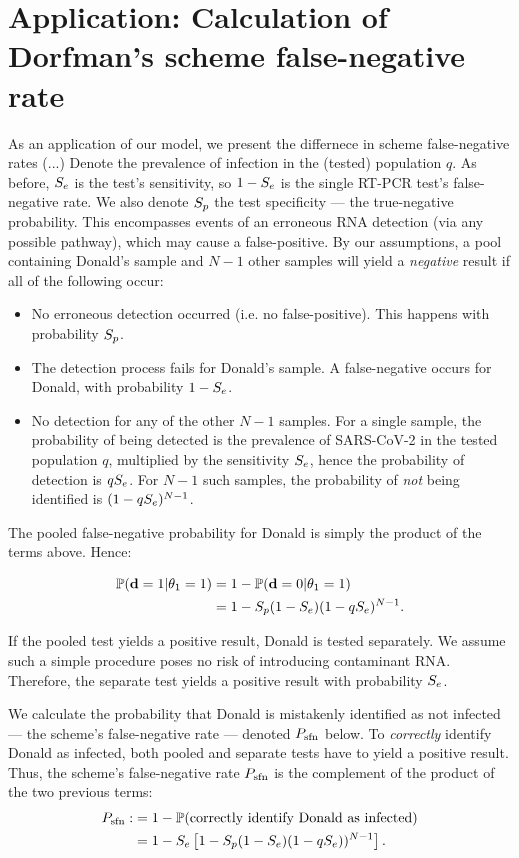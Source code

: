 \documentclass{article}
\begin{document}
\section{Application: Calculation of Dorfman's scheme false-negative rate}\label{subsec:detailed}
As an application of our model, we present the differnece in scheme
false-negative rates (...) Denote the prevalence of infection in the
(tested) population $q$. As before, $S_e$ is the test's sensitivity,
so $1-S_e$ is the single RT-PCR test's false-negative rate. We also
denote $S_p$ the test specificity --- the true-negative
probability. This encompasses events of an erroneous RNA detection
(via any possible pathway), which may cause a false-positive. By our
assumptions, a pool containing Donald's sample and $N-1$ other samples
will yield a \emph{negative} result if all of the following occur:
\begin{itemize}
\item No erroneous detection occurred (i.e. no false-positive). This
  happens with probability $S_p$.
\item The detection process fails for Donald's sample. A
  false-negative occurs for Donald, with probability $1-S_e$.
\item No detection for any of the other $N-1$ samples. For a single
  sample, the probability of being detected is the prevalence of
  SARS-CoV-2 in the tested population $q$, multiplied by the
  sensitivity $S_e$, hence the probability of detection is $qS_e$. For
  $N-1$ such samples, the probability of \emph{not} being identified
  is $(1-qS_e)^{N-1}$.
\end{itemize}
The pooled false-negative probability for Donald is simply the product of the terms above. Hence:

\begin{align}
    \begin{split}
        \mathbb{P}(\mathbf{d}=1|\theta_1=1) &= 1 - \mathbb{P}(\mathbf{d}=0|\theta_1=1) \\
        &= 1 - S_p(1-S_e)(1-qS_e)^{N-1}.
    \end{split}
\end{align}

If the pooled test yields a positive result, Donald is tested
separately. We assume such a simple procedure poses no risk of
introducing contaminant RNA. Therefore, the separate test yields a
positive result with probability $S_e$.

We calculate the probability that Donald is mistakenly identified as
not infected --- the scheme's false-negative rate --- denoted $P_{\text{sfn}}$
below. To \emph{correctly} identify Donald as infected, both pooled
and separate tests have to yield a positive result. Thus, the scheme's
false-negative rate $P_{\text{sfn}}$ is the complement of the product of the two
previous terms:
\begin{align}\label{eq:sfn}
    \begin{split}
        P_{\text{sfn}} :&= 1-\mathbb{P}(\text{correctly identify Donald as infected})\\
        &= 1 - S_e\left [1 - S_p(1-S_e)(1-qS_e))^{N-1}\right].
    \end{split}
\end{align}
\end{document}
